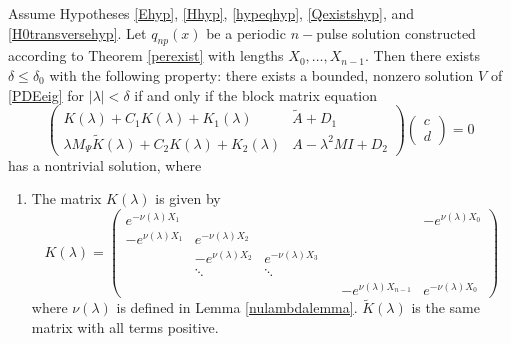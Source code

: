 \documentclass[thesis.tex]{subfiles}
\begin{document}
\begin{theorem}\label{blockmatrixtheorem}
Assume Hypotheses \ref{Ehyp}, \ref{Hhyp}, \ref{hypeqhyp}, \ref{Qexistshyp}, and \ref{H0transversehyp}. Let $q_{np}(x)$ be a periodic $n-$pulse solution constructed according to Theorem \ref{perexist} with lengths $X_0, \dots, X_{n-1}$. Then there exists $\delta \leq \delta_0$ with the following property: there exists a bounded, nonzero solution $V$ of \eqref{PDEeig} for $|\lambda| < \delta$ if and only if the block matrix equation
\begin{equation}\label{blockeq}
\begin{pmatrix}
K(\lambda) + C_1 K(\lambda) + K_1(\lambda) & \tilde{A} + D_1 \\
\lambda M_\Psi \tilde{K}(\lambda) + C_2 K(\lambda) + K_2(\lambda) & A - \lambda^2 MI + D_2
\end{pmatrix}
\begin{pmatrix} c \\ d \end{pmatrix} = 0
\end{equation}
has a nontrivial solution, where 

\begin{enumerate}
\item The matrix $K(\lambda)$ is given by
\begin{equation}
K(\lambda) = 
\begin{pmatrix}
e^{-\nu(\lambda)X_1} & & & & & -e^{\nu(\lambda)X_0} \\
-e^{\nu(\lambda)X_1} & e^{-\nu(\lambda)X_2} \\
& -e^{\nu(\lambda)X_2} & e^{-\nu(\lambda)X_3} \\
& \ddots & \ddots & &&  \\
& & & & -e^{\nu(\lambda)X_{n-1}} & e^{-\nu(\lambda)X_0} 
\end{pmatrix}
\end{equation}
where $\nu(\lambda)$ is defined in Lemma \ref{nulambdalemma}. $\tilde{K}(\lambda)$ is the same matrix with all terms positive.


\end{enumerate}
\end{theorem}
\end{document}
